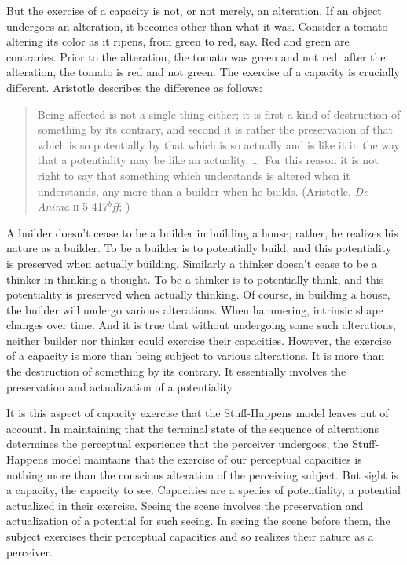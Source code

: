 \documentclass[12pt]{article}
\begin{document}
But the exercise of a capacity is not, or not merely, an alteration. If an object undergoes an alteration, it becomes other than what it was. Consider a tomato altering its color as it ripens, from green to red, say. Red and green are contraries. Prior to the alteration, the tomato was green and not red; after the alteration, the tomato is red and not green. The exercise of a capacity is crucially different. Aristotle describes the difference as follows:
\begin{quote}
    Being affected is not a single thing either; it is first a kind of destruction of something by its contrary, and second it is rather the preservation of that which is so potentially by that which is so actually and is like it in the way that a potentiality may be like an actuality. \ldots\ For this reason it is not right to say that something which understands is altered when it understands, any more than a builder when he builds. (Aristotle, \emph{De Anima} \textsc{ii} 5 417\( ^{b} \)\emph{ff}; \citealt[23--24]{Hamlyn:2002ys})
\end{quote}
A builder doesn't cease to be a builder in building a house; rather, he realizes his nature as a builder. To be a builder is to potentially build, and this potentiality is preserved when actually building. Similarly a thinker doesn't cease to be a thinker in thinking a thought. To be a thinker is to potentially think, and this potentiality is preserved when actually thinking.  Of course, in building a house, the builder will undergo various alterations. When hammering, intrinsic shape changes over time. And it is true that without undergoing some such alterations, neither builder nor thinker could exercise their capacities. However, the exercise of a capacity is more than being subject to various alterations. It is more than the destruction of something by its contrary. It essentially involves the preservation and actualization of a potentiality.

It is this aspect of capacity exercise that the Stuff-Happens model leaves out of account. In maintaining that the terminal state of the sequence of alterations determines the perceptual experience that the perceiver undergoes, the Stuff-Happens model maintains that the exercise of our perceptual capacities is nothing more than the conscious alteration of the perceiving subject. But sight is a capacity, the capacity to see. Capacities are a species of potentiality, a potential actualized in their exercise. Seeing the scene involves the preservation and actualization of a potential for such seeing. In seeing the scene before them, the subject exercises their perceptual capacities and so realizes their nature as a perceiver.
\end{document}
